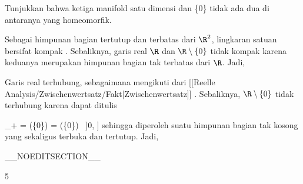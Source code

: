 {

Tunjukkan bahwa ketiga manifold satu dimensi
 {} {\R} {dan} {\R \setminus \{0\}} {}
tidak ada dua di antaranya yang homeomorfik.

}
{

Sebagai himpunan bagian tertutup dan terbatas dari $\R^2$, lingkaran satuan bersifat kompak
 {} {.} Sebaliknya, garis real $\R$ dan $\R \setminus \{0\}$ tidak kompak karena keduanya merupakan himpunan bagian tak terbatas dari $\R$. Jadi,

Garis real terhubung, sebagaimana mengikuti dari
[[Reelle Analysis/Zwischenwertsatz/Fakt|Zwischenwertsatz]]
. Sebaliknya, $\R \setminus \{0\}$ tidak terhubung karena dapat ditulis

\mavergleichskettedisp
{\vergleichskette
{\R_+
}
{ =} {(\R \setminus \{0\}) \cap [0, \infty]
}
{ =} {(\R \setminus \{0\}) \cap \, ]0, \infty]
}
{ } {
}
{ } {
}
}
{}{}{}
sehingga diperoleh suatu himpunan bagian tak kosong yang sekaligus terbuka dan tertutup. Jadi,

 }

__NOEDITSECTION__

{5}

